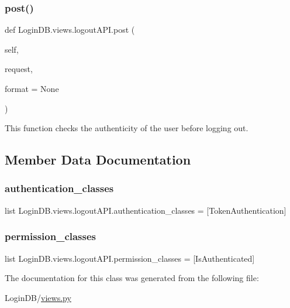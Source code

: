 \subsubsection{\texorpdfstring{post()}{post()}}
{\footnotesize\ttfamily def Login\+D\+B.\+views.\+logout\+A\+P\+I.\+post (\begin{DoxyParamCaption}\item[{}]{self,  }\item[{}]{request,  }\item[{}]{format = {\ttfamily None} }\end{DoxyParamCaption})}



This function checks the authenticity of the user before logging out. 



\subsection{Member Data Documentation}
\mbox{\label{class_login_d_b_1_1views_1_1logout_a_p_i_addd5aaad214346e3d7895cbfa458e752}} 
\subsubsection{\texorpdfstring{authentication\+\_\+classes}{authentication\_classes}}
{\footnotesize\ttfamily list Login\+D\+B.\+views.\+logout\+A\+P\+I.\+authentication\+\_\+classes = \mbox{[}Token\+Authentication\mbox{]}\hspace{0.3cm}{\ttfamily [static]}}

\mbox{\label{class_login_d_b_1_1views_1_1logout_a_p_i_a26713c74c039579b0b048a0a6239f048}} 
\subsubsection{\texorpdfstring{permission\+\_\+classes}{permission\_classes}}
{\footnotesize\ttfamily list Login\+D\+B.\+views.\+logout\+A\+P\+I.\+permission\+\_\+classes = \mbox{[}Is\+Authenticated\mbox{]}\hspace{0.3cm}{\ttfamily [static]}}



The documentation for this class was generated from the following file\+:\begin{DoxyCompactItemize}
\item 
Login\+D\+B/\hyperlink{views_8py}{views.\+py}\end{DoxyCompactItemize}
